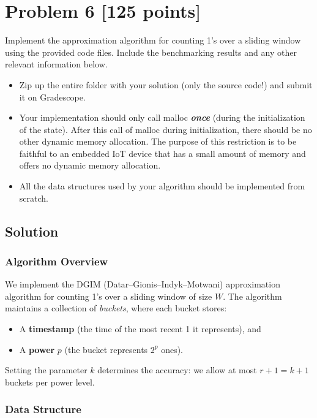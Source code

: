 \documentclass[11pt]{article}
\begin{document}
\section*{Problem 6 [125 points]}

Implement the approximation algorithm for counting 1's over a sliding window using the provided code files. Include the benchmarking results and any other relevant information below.
\begin{itemize}[$-$]
\item
Zip up the entire folder with your solution (only the source code!) and submit it on Gradescope.
\item
Your implementation should only call malloc \textbf{\em once} (during the initialization of the state). After this call of malloc during initialization, there should be no other dynamic memory allocation. The purpose of this restriction is to be faithful to an embedded IoT device that has a small amount of memory and offers no dynamic memory allocation.
\item
All the data structures used by your algorithm should be implemented from scratch.
\end{itemize}

\subsection*{Solution}

\subsubsection*{Algorithm Overview}

We implement the DGIM (Datar--Gionis--Indyk--Motwani) approximation algorithm for counting 1's over a sliding window of size $W$. The algorithm maintains a collection of \emph{buckets}, where each bucket stores:
\begin{itemize}
\item A \textbf{timestamp} (the time of the most recent 1 it represents), and
\item A \textbf{power} $p$ (the bucket represents $2^p$ ones).
\end{itemize}

\noindent
Setting the parameter $k$ determines the accuracy: we allow at most $r + 1 = k + 1$ buckets per power level.

\subsubsection*{Data Structure}
\end{document}
